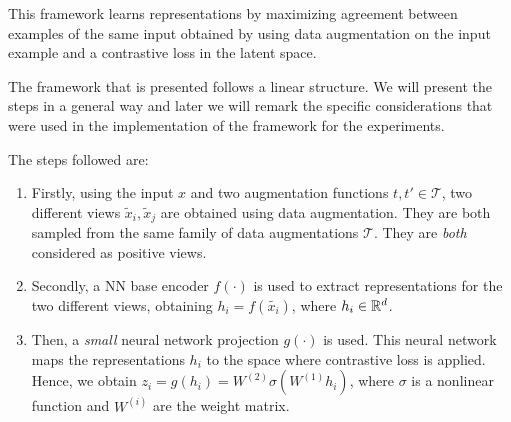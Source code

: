This framework learns representations by maximizing agreement between examples of the same input obtained by using data augmentation on the input example and a contrastive loss in the latent space. 


The framework that is presented follows a linear structure. We will present the steps in a general way and later we will remark the specific considerations that were used in the implementation of the framework for the experiments. 

The steps followed are:
\begin{enumerate}
\item Firstly, using the input $x$ and two augmentation functions $t,t' \in \mathcal T$, two different views $\tilde x_i,\tilde x_j$ are obtained using data augmentation. They are both sampled from the same family of data augmentations $\mathcal T$. They are \emph{both} considered as positive views.
\item Secondly, a NN base encoder $f(\cdot)$ is used to extract representations for the two different views, obtaining $h_i = f(\tilde{x_i})$, where $h_i \in \mathbb{R}^d$.  

\item Then, a \emph{small} neural network projection $g(\cdot)$ is used. This neural network maps the representations $h_i$ to the space where contrastive loss is applied. Hence, we obtain $z_i = g(h_i) = W^{(2)}\sigma(W^{(1)}h_i)$, where $\sigma$ is a nonlinear function and $W^{(i)}$ are the weight matrix.


\end{enumerate}
